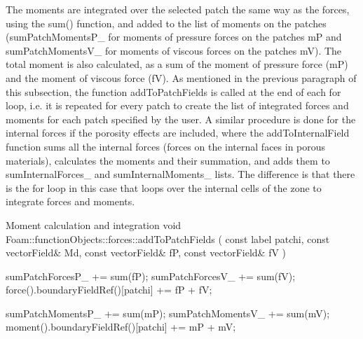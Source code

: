 {{{The moments are integrated over the selected patch the same way as the forces, using the sum() function, and added to the list of moments on the patches (sumPatchMomentsP\_ for moments of pressure forces on the patches mP and sumPatchMomentsV\_ for moments of viscous forces on the patches mV). The total moment is also calculated, as a sum of the moment of pressure force (mP) and the moment of viscous force (fV). As mentioned in the previous paragraph of this subsection,
the function addToPatchFields is called at the end of each for loop, i.e. it is repeated for every patch to create the list of integrated forces and moments for each patch specified by the user. A similar procedure is done for the internal forces if the porosity effects are included, where the addToInternalField function sums all the internal forces (forces on the internal faces in porous
materials), calculates the moments and their summation, and adds them to sumInternalForces\_ and sumInternalMoments\_ lists. The difference is that there is the for loop in this case that loops over the internal cells of the zone to integrate forces and moments. 

Moment calculation and integration
void Foam::functionObjects::forces::addToPatchFields
(
const label patchi,
const vectorField\& Md,
const vectorField\& fP,
const vectorField\& fV
)
{
sumPatchForcesP\_ += sum(fP);
sumPatchForcesV\_ += sum(fV);
force().boundaryFieldRef()[patchi] += fP + fV;


sumPatchMomentsP\_ += sum(mP);
sumPatchMomentsV\_ += sum(mV);
moment().boundaryFieldRef()[patchi] += mP + mV;
}

}}}
